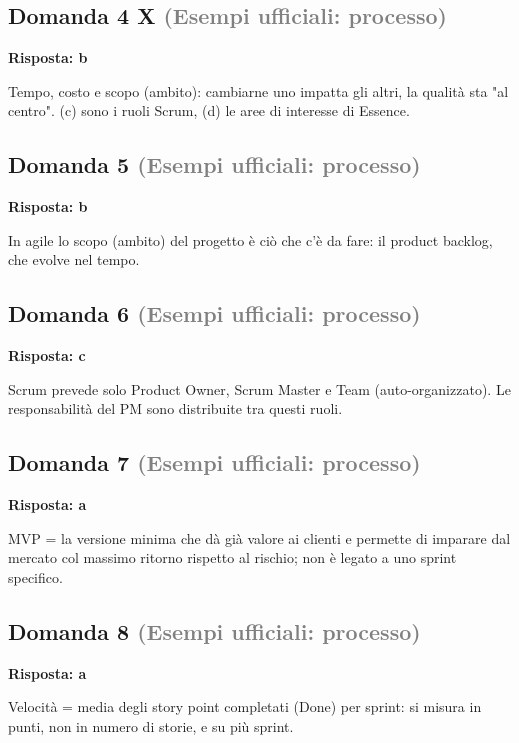 \documentclass[a4paper,11pt]{article}
\begin{document}
\subsection*{Domanda 4 X \hfill {\small \textcolor{gray}{(Esempi ufficiali: processo)}}}
\textbf{Risposta: b}\par
Tempo, costo e scopo (ambito): cambiarne uno impatta gli altri, la qualità sta "al centro". (c) sono i ruoli Scrum, (d) le aree di interesse di Essence.



\subsection*{Domanda 5 \hfill {\small \textcolor{gray}{(Esempi ufficiali: processo)}}}
\textbf{Risposta: b}\par
In agile lo scopo (ambito) del progetto è ciò che c'è da fare: il product backlog, che evolve nel tempo.



\subsection*{Domanda 6 \hfill {\small \textcolor{gray}{(Esempi ufficiali: processo)}}}
\textbf{Risposta: c}\par
Scrum prevede solo Product Owner, Scrum Master e Team (auto-organizzato). Le responsabilità del PM sono distribuite tra questi ruoli.



\subsection*{Domanda 7 \hfill {\small \textcolor{gray}{(Esempi ufficiali: processo)}}}
\textbf{Risposta: a}\par
MVP = la versione minima che dà già valore ai clienti e permette di imparare dal mercato col massimo ritorno rispetto al rischio; non è legato a uno sprint specifico.



\subsection*{Domanda 8 \hfill {\small \textcolor{gray}{(Esempi ufficiali: processo)}}}
\textbf{Risposta: a}\par
Velocità = media degli story point completati (Done) per sprint: si misura in punti, non in numero di storie, e su più sprint.
\end{document}
